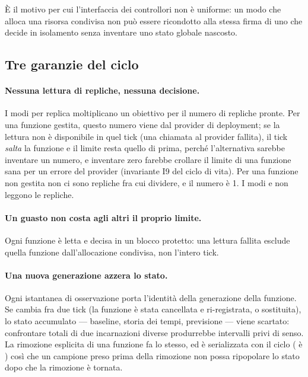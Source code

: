 \`E il motivo per cui l'interfaccia dei controllori non \`e uniforme: un modo che
alloca una risorsa condivisa non pu\`o essere ricondotto alla stessa firma di uno
che decide in isolamento senza inventare uno stato globale nascosto.

\subsection{Tre garanzie del ciclo}

\paragraph{Nessuna lettura di repliche, nessuna decisione.} I modi per replica
moltiplicano un obiettivo per il numero di repliche pronte. Per una funzione
gestita, questo numero viene dal provider di deployment; se la lettura non \`e
disponibile in quel tick (una chiamata al provider fallita), il tick \emph{salta}
la funzione e il limite resta quello di prima, perch\'e l'alternativa sarebbe
inventare un numero, e inventare zero farebbe crollare il limite di una funzione
sana per un errore del provider (invariante I9 del ciclo di vita). Per una
funzione non gestita non ci sono repliche fra cui dividere, e il numero \`e 1. I
modi  e  non leggono le repliche.

\paragraph{Un guasto non costa agli altri il proprio limite.} Ogni funzione \`e
letta e decisa in un blocco protetto: una lettura fallita esclude quella funzione
dall'allocazione condivisa, non l'intero tick.

\paragraph{Una nuova generazione azzera lo stato.} Ogni istantanea di osservazione
porta l'identit\`a della generazione della funzione. Se cambia fra due tick (la
funzione \`e stata cancellata e ri-registrata, o sostituita), lo stato accumulato
--- baseline, storia dei tempi, previsione --- viene scartato: confrontare
totali di due incarnazioni diverse produrrebbe intervalli privi di senso. La
rimozione esplicita di una funzione fa lo stesso, ed \`e serializzata con il ciclo
( \`e ) cos\`i che un campione preso prima
della rimozione non possa ripopolare lo stato dopo che la rimozione \`e
tornata.

